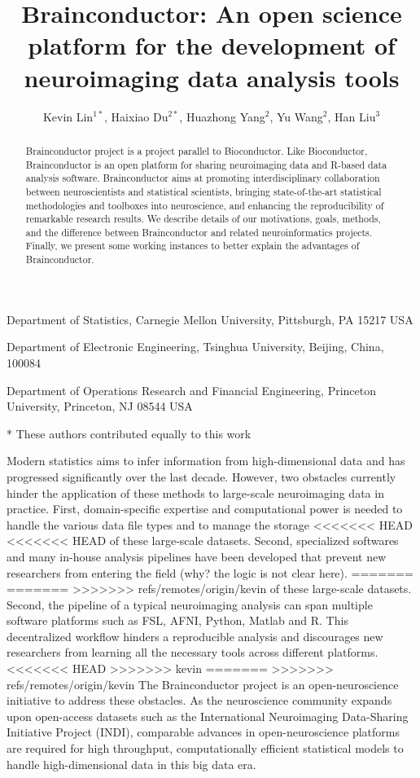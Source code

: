 \documentclass{nature}
\title{Brainconductor: An open science platform for the development of
neuroimaging
data analysis tools}
\author{Kevin Lin$^{1*}$, Haixiao Du$^{2*}$, Huazhong
Yang$^2$, Yu Wang$^2$, Han Liu$^3$}
\begin{document}
\maketitle



\begin{affiliations}
\item Department of Statistics, Carnegie Mellon University,
Pittsburgh, PA 15217 USA
\item Department of Electronic Engineering, Tsinghua University, Beijing, China,
100084
\item Department of Operations Research and Financial Engineering, Princeton
University, Princeton, NJ 08544 USA
\item[*] These authors contributed equally to this work
\end{affiliations}

\begin{abstract}
    Brainconductor project is a project parallel to Bioconductor. Like
Bioconductor, Brainconductor is an open platform for sharing neuroimaging data
and R-based data analysis software. Brainconductor aims at promoting
interdisciplinary collaboration between neuroscientists and
statistical scientists, bringing state-of-the-art statistical methodologies and
toolboxes into neuroscience, and enhancing the reproducibility of remarkable
research results. We describe details of our motivations, goals, methods, and
the difference between Brainconductor and related neuroinformatics projects.
Finally, we present some working instances to better explain the advantages of
Brainconductor.
\end{abstract}


Modern statistics aims to infer information from high-dimensional data
and has progressed significantly over the last decade.
However, two obstacles currently hinder the
application of these methods to large-scale neuroimaging data
in practice. 
First, domain-specific expertise and computational power is needed to handle
the various data file types and to manage the storage
<<<<<<< HEAD
<<<<<<< HEAD
of these large-scale datasets. Second, specialized softwares and
many in-house analysis pipelines have been developed that
prevent new researchers from entering the field {\color{red}(why? the logic is not clear here)}.
=======
=======
>>>>>>> refs/remotes/origin/kevin
of these large-scale datasets. Second, the pipeline of a typical
neuroimaging analysis can span multiple software platforms such as FSL, AFNI,
Python, Matlab and R. This decentralized workflow hinders a reproducible 
analysis and discourages new researchers from learning all the
necessary tools across different platforms.
<<<<<<< HEAD
>>>>>>> kevin
=======
>>>>>>> refs/remotes/origin/kevin
The Brainconductor project is an open-neuroscience
initiative to address
these obstacles.
As the neuroscience community expands upon open-access
datasets such as the  International Neuroimaging Data-Sharing
Initiative Project (INDI), comparable advances in
open-neuroscience platforms are required
for high
throughput, computationally efficient statistical models
to handle high-dimensional data in this big data era.
\end{document}
